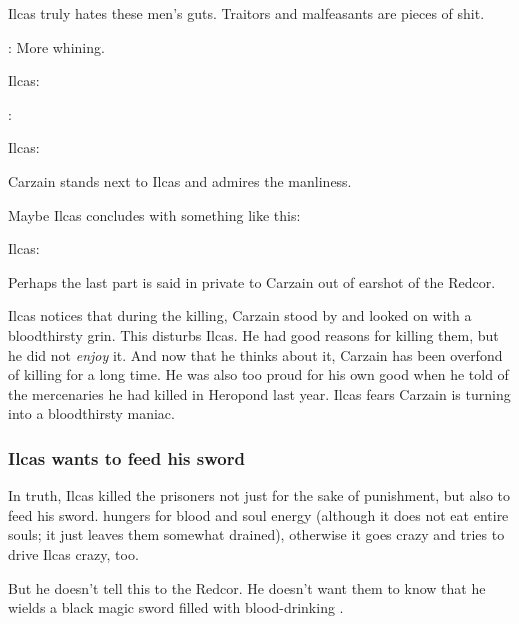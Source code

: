 Ilcas truly hates these men's guts. 
Traitors and malfeasants are pieces of shit. 

\begin{prose}
  \Esmerel: More whining. 
  
  Ilcas: 
  
  \Esmerel: 
  
  Ilcas: 
\end{prose}

Carzain stands next to Ilcas and admires the manliness. 

Maybe Ilcas concludes with something like this: 

\begin{prose}
  Ilcas: 
\end{prose}

Perhaps the last part is said in private to Carzain out of earshot of the Redcor. 

Ilcas notices that during the killing, Carzain stood by and looked on with a bloodthirsty grin. 
This disturbs Ilcas. 
He had good reasons for killing them, but he did not \emph{enjoy} it. 
And now that he thinks about it, Carzain has been overfond of killing for a long time. 
He was also too proud for his own good when he told of the mercenaries he had killed in Heropond last year. 
Ilcas fears Carzain is turning into a bloodthirsty maniac. 





\subsubsection{Ilcas wants to feed his sword}
In truth, Ilcas killed the prisoners not just for the sake of punishment, but also to feed his sword. 
\Telderain{} hungers for blood and soul energy (although it does not eat entire souls; it just leaves them somewhat drained), otherwise it goes crazy and tries to drive Ilcas crazy, too.  

But he doesn't tell this to the Redcor. 
He doesn't want them to know that he wields a black magic sword filled with blood-drinking \daemons. 





